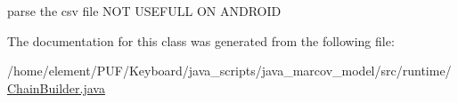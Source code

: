parse the csv file N\+OT U\+S\+E\+F\+U\+LL ON A\+N\+D\+R\+O\+ID 



The documentation for this class was generated from the following file\+:\begin{DoxyCompactItemize}
\item 
/home/element/\+P\+U\+F/\+Keyboard/java\+\_\+scripts/java\+\_\+marcov\+\_\+model/src/runtime/\hyperlink{_chain_builder_8java}{Chain\+Builder.\+java}\end{DoxyCompactItemize}

